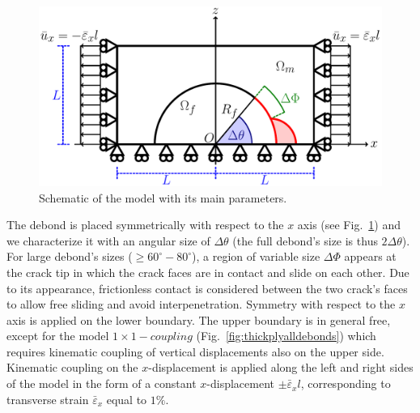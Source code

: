 \documentclass[review]{elsarticle}
\begin{document}
\begin{figure}[!h]
\centering
        \includegraphics[width=\textwidth]{RUC.pdf}

\caption{Schematic of the model with its main parameters.}\label{subfig:modelschem}
\end{figure}

The debond is placed symmetrically with respect to the $x$ axis (see Fig.~\ref{subfig:modelschem}) and we characterize it with an angular size of $\Delta\theta$ (the full debond's size is thus $2\Delta\theta$). For large debond's sizes ($\geq 60^{\circ}-80^{\circ}$), a region of variable size $\Delta\Phi$ appears at the crack tip in which the crack faces are in contact and slide on each other. Due to its appearance, frictionless contact is considered between the two crack's faces to allow free sliding and avoid interpenetration. Symmetry with respect to the $x$ axis is applied on the lower boundary. The upper boundary is in general free, except for the model $1\times 1-coupling$ (Fig.~\ref{fig:thickplyalldebonds}) which requires kinematic coupling of vertical displacements also on the upper side. Kinematic coupling on the $x$-displacement is applied along the left and right sides of the model in the form of a constant $x$-displacement $\pm\bar{\varepsilon}_{x} l$, corresponding to transverse strain $\bar{\varepsilon}_{x}$ equal to $1\%$.
\end{document}
